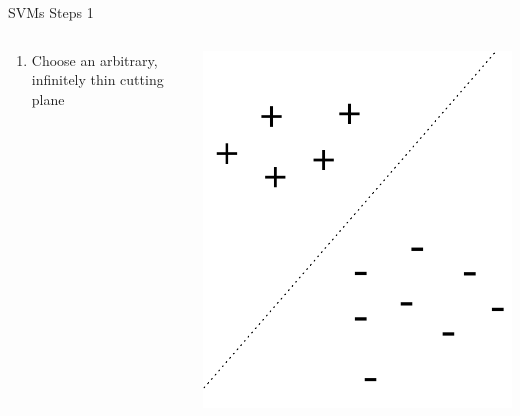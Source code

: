 \documentclass[aspectratio=169]{beamer}
\begin{document}
\begin{frame}{SVMs Steps 1}

\begin{columns}[T]
\begin{column}{0.6\textwidth}
\begin{enumerate}
\item  Choose an arbitrary, infinitely thin cutting plane
\end{enumerate}
\end{column}
\begin{column}{0.4\textwidth}
\includegraphics[width=1\textwidth]{lectSVM/svm1}
\end{column}
\end{columns}
\end{frame}
\end{document}
